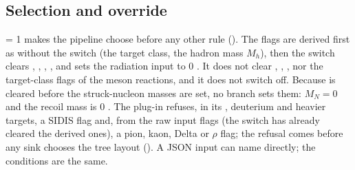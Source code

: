 \documentclass{simcnote}
\begin{document}
\subsection{Selection and override}
 = 1 makes the pipeline choose  before any other rule (). The
flags are derived first as without the switch (the target class, the hadron mass $M_h$), then the switch clears
, , , ,  and sets the radiation
input  to 0 . It does not clear , ,
,  nor the target-class flags of the meson reactions, and it does not switch
 off. Because  is cleared before the struck-nucleon masses are set, no branch sets them:
$M_N=0$ and the recoil mass is 0 . The plug-in  refuses, in its ,
deuterium and heavier targets, a SIDIS flag and, from the raw input flags (the switch has already cleared the derived
ones), a pion, kaon, Delta or $\rho$ flag; the refusal comes before any sink chooses the tree layout (). A JSON input can name 
directly; the conditions are the same.
\end{document}
